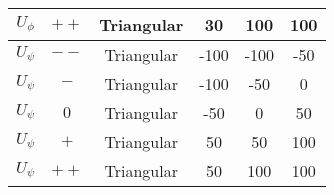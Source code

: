 \begin{center}
\begin{longtable}{|c|c|c|c|c|c|}
        $U_{\phi}$ & $++$ & Triangular & 30 & 100 & 100 \\
        \hline
        $U_{\psi}$ & $--$ & Triangular & -100 & -100 & -50 \\
        $U_{\psi}$ & $-$  & Triangular & -100 & -50 & 0 \\
        $U_{\psi}$ & $0$  & Triangular & -50 & 0 & 50 \\
        $U_{\psi}$ & $+$  & Triangular & 50 & 50 & 100 \\
        $U_{\psi}$ & $++$ & Triangular & 50 & 100 & 100 \\
        \hline
    \end{longtable}
\end{center}
\vspace{-1.5cm}